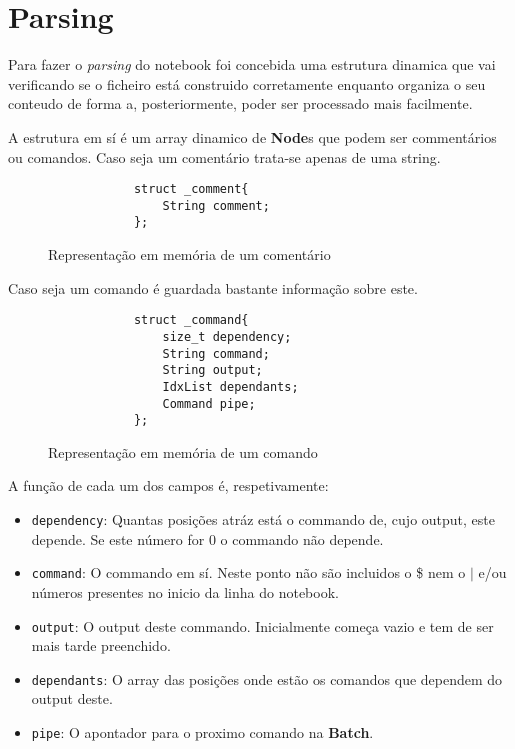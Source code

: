 \documentclass[12pt,a4paper]{report}
\begin{document}
\chapter{Parsing}
    Para fazer o \textit{parsing} do notebook foi concebida uma estrutura
    dinamica que vai verificando se o ficheiro está construido corretamente
    enquanto organiza o seu conteudo de forma a, posteriormente, poder ser
    processado mais facilmente.

    A estrutura em sí é um array dinamico de \textbf{Node}s que podem ser
    commentários ou comandos. Caso seja um comentário trata-se apenas de
    uma string.
    \begin{figure}[h]
        \centering
        \begin{verbatim}
            struct _comment{
                String comment;
            };
        \end{verbatim}
        \caption{Representação em memória de um comentário}
        \label{fig:commentStruct}
    \end{figure}

    Caso seja um comando é guardada bastante informação sobre este.
    \begin{figure}[h]
        \centering
        \begin{verbatim}
            struct _command{
                size_t dependency;
                String command;
                String output;
                IdxList dependants;
                Command pipe;
            };
        \end{verbatim}
        \caption{Representação em memória de um comando}
    \end{figure}

    A função de cada um dos campos é, respetivamente:
    \begin{itemize}
        \item \texttt{dependency}: Quantas posições atráz está o commando
            de, cujo output, este depende. Se este número for 0 o commando não
            depende.

        \item \texttt{command}: O commando em sí. Neste ponto não são
            incluidos o \$ nem o $|$ e/ou números presentes no inicio da linha
            do notebook.

        \item \texttt{output}: O output deste commando. Inicialmente
            começa vazio e tem de ser mais tarde preenchido.

        \item \texttt{dependants}: O array das posições onde estão os
            comandos que dependem do output deste.

        \item \texttt{pipe}: O apontador para o proximo comando na
            \textbf{Batch}. %
    \end{itemize}
\end{document}
